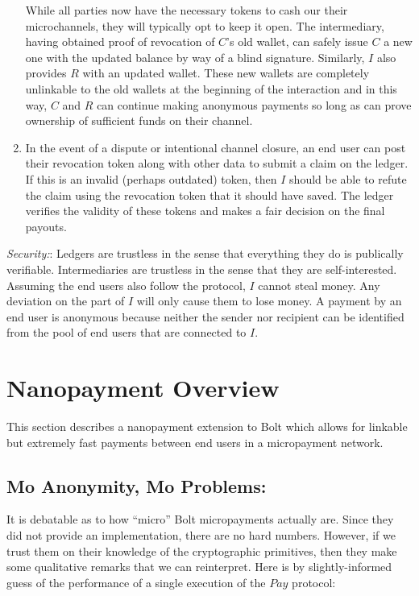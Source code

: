 \documentclass{article}
\begin{document}
\begin{enumerate}
While all parties now have the necessary tokens to cash our their microchannels, they will typically opt to keep it open. The intermediary, having obtained proof of revocation of $C$'s old wallet, can safely issue $C$ a new one with the updated balance by way of a blind signature. Similarly, $I$ also provides $R$ with an updated wallet. These new wallets are completely unlinkable to the old wallets at the beginning of the interaction and in this way, $C$ and $R$ can continue making anonymous payments so long as can prove ownership of sufficient funds on their channel.

\item In the event of a dispute or intentional channel closure, an end user can post their revocation token along with other data to submit a claim on the ledger. If this is an invalid (perhaps outdated) token, then $I$ should be able to refute the claim using the revocation token that it should have saved. The ledger verifies the validity of these tokens and makes a fair decision on the final payouts.
\end{enumerate}

\emph{Security:}: Ledgers are trustless in the sense that everything they do is publically verifiable. Intermediaries are trustless in the sense that they are self-interested. Assuming the end users also follow the protocol, $I$ cannot steal money. Any deviation on the part of $I$ will only cause them to lose money. A payment by an end user is anonymous because neither the sender nor recipient can be identified from the pool of end users that are connected to $I$.

\section{Nanopayment Overview}

This section describes a nanopayment extension to Bolt which allows for linkable but extremely fast payments between end users in a micropayment network.

\subsection{Mo Anonymity, Mo Problems:} It is debatable as to how ``micro'' Bolt micropayments actually are. Since they did not provide an implementation, there are no hard numbers. However, if we trust them on their knowledge of the cryptographic primitives, then they make some qualitative remarks that we can reinterpret. Here is by slightly-informed guess of the performance of a single execution of the $Pay$ protocol:
\end{document}
